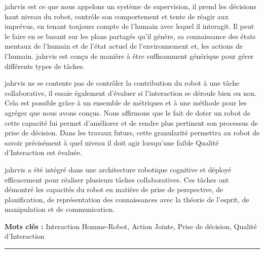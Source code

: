 \documentclass[english,a4paper,11pt,twoside]{StyleThese}
\begin{document}
\begin{vcenterpage}
\acrfull{jahrvis} est ce que nous appelons un système de supervision, \ie il prend les décisions haut niveau du robot, contrôle son comportement et tente de réagir aux imprévus, en tenant toujours compte de l'humain avec lequel il interagit. Il peut le faire en se basant sur les plans partagés qu’il génère, sa connaissance des états mentaux de l'humain et de l'état actuel de l'environnement et, les actions de l'humain. \acrshort{jahrvis} est conçu de manière à être suffisamment générique pour gérer différents types de tâches.

\acrshort{jahrvis} ne se contente pas de contrôler la contribution du robot à une tâche collaborative, il essaie également d'évaluer si l'interaction se déroule bien ou non. Cela est possible grâce à un ensemble de métriques et à une méthode pour les agréger que nous avons conçus. Nous affirmons que le fait de doter un robot de cette capacité lui permet d'améliorer et de rendre plus pertinent son processus de prise de décision. Dans les travaux futurs, cette granularité permettra au robot de savoir précisément à quel niveau il doit agir lorsqu'une faible Qualité d'Interaction est évaluée.

\acrshort{jahrvis} a été intégré dans une architecture robotique cognitive et déployé efficacement pour réaliser plusieurs tâches collaboratives. Ces tâches ont démontré les capacités du robot en matière de prise de perspective, de planification, de représentation des connaissances avec la théorie de l'esprit, de manipulation et de communication.

\textbf{Mots clés :} Interaction Homme-Robot, Action Jointe, Prise de décision, Qualité d'Interaction
\\
\noindent\rule{\textwidth}{0.5pt}
\end{vcenterpage}
\end{document}
